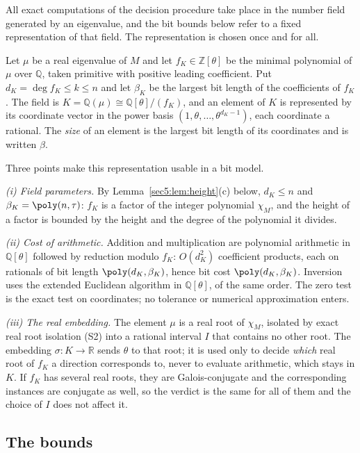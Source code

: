 All exact computations of the decision procedure take place in the number field generated by an
eigenvalue, and the bit bounds below refer to a fixed representation of that field. The representation
is chosen once and for all.

\begin{defn}\label{sec5:def:model}
Let $\mu$ be a real eigenvalue of $M$ and let $f_K\in\mathbb{Z}[\theta]$ be the minimal polynomial of
$\mu$ over $\mathbb{Q}$, taken primitive with positive leading coefficient. Put
$d_K=\deg f_K\le k\le n$ and let $\beta_K$ be the largest bit length of the coefficients of $f_K$. The
field is $K=\mathbb{Q}(\mu)\cong\mathbb{Q}[\theta]/(f_K)$, and an element of $K$ is represented by its
coordinate vector in the power basis $(1,\theta,\dots,\theta^{d_K-1})$, each coordinate a rational.
The \emph{size} of an element is the largest bit length of its coordinates and is written $\beta$.
\end{defn}

Three points make this representation usable in a bit model.

\emph{(i) Field parameters.} By Lemma~\ref{sec5:lem:height}(c) below, $d_K\le n$ and
$\beta_K=\poly(n,\tau)$: $f_K$ is a factor of the integer polynomial $\chi_M$, and the height of a
factor is bounded by the height and the degree of the polynomial it divides.

\emph{(ii) Cost of arithmetic.} Addition and multiplication are polynomial arithmetic in
$\mathbb{Q}[\theta]$ followed by reduction modulo $f_K$: $O(d_K^{2})$ coefficient products, each on
rationals of bit length $\poly(d_K,\beta_K)$, hence bit cost $\poly(d_K,\beta_K)$. Inversion uses the
extended Euclidean algorithm in $\mathbb{Q}[\theta]$, of the same order. The zero test is the exact
test on coordinates; no tolerance or numerical approximation enters.

\emph{(iii) The real embedding.} The element $\mu$ is a real root of $\chi_M$, isolated by exact real
root isolation (S2) into a rational interval $I$ that contains no other root. The embedding
$\sigma\colon K\to\mathbb{R}$ sends $\theta$ to that root; it is used only to decide \emph{which} real
root of $f_K$ a direction corresponds to, never to evaluate arithmetic, which stays in $K$. If $f_K$
has several real roots, they are Galois-conjugate and the corresponding instances are conjugate as well,
so the verdict is the same for all of them and the choice of $I$ does not affect it.


\subsection{The bounds}\label{sec5:sub:height}\label{sec5:sub:charpoly}\label{sec5:sub:eigvec}

